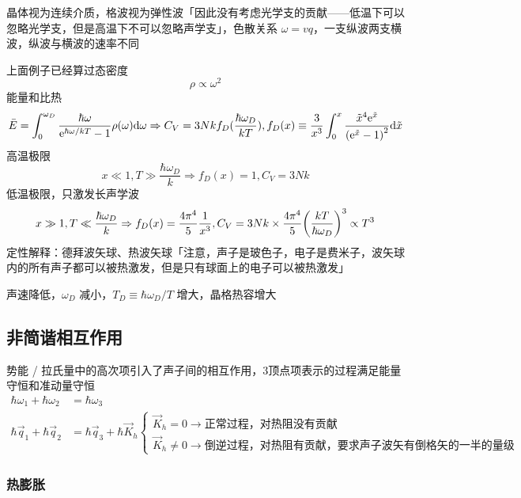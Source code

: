 晶体视为连续介质，格波视为弹性波「因此没有考虑光学支的贡献——低温下可以忽略光学支，但是高温下不可以忽略声学支」，色散关系 $\omega = v q$，一支纵波两支横波，纵波与横波的速率不同

上面例子已经算过态密度
\[ \rho \propto \omega^2 \]
能量和比热
\[ \bar{E} = \int_0^{\omega_D} \frac{\hbar \omega}{\mathrm{e}^{\hbar \omega/k T} - 1} \rho(\omega) \dd \omega \Rightarrow C_V = 3 N k f_D(\frac{\hbar \omega_D}{k T}), f_D(x) \equiv \frac{3}{x^3} \int_0^x \frac{\tilde{x}^4 \mathrm{e}^{\tilde{x}}}{\qty(\mathrm{e}^{\tilde{x}} - 1)^2} \dd \tilde{x} \]
高温极限
\[ x \ll 1, T \gg \frac{\hbar \omega_D}{k} \Rightarrow f_D(x) = 1, C_V = 3 N k \]
低温极限，只激发长声学波
\[ x \gg 1, T \ll \frac{\hbar \omega_D}{k} \Rightarrow f_D(x) = \frac{4 \pi^4}{5} \frac{1}{x^3}, C_V = 3 N k \times \frac{4 \pi^4}{5} \qty(\frac{k T}{\hbar \omega_D})^3 \propto T^3 \]
定性解释：德拜波矢球、热波矢球「注意，声子是玻色子，电子是费米子，波矢球内的所有声子都可以被热激发，但是只有球面上的电子可以被热激发」

{\color{gray}声速降低，$\omega_D$ 减小，$T_D \equiv \hbar \omega_D / T$ 增大，晶格热容增大}

\subsection{非简谐相互作用}

势能 / 拉氏量中的高次项引入了声子间的相互作用，3顶点项表示的过程满足能量守恒和准动量守恒
\begin{align*}
    \hbar \omega_1 + \hbar \omega_2   & = \hbar \omega_3                                                                              \\
    \hbar \vec{q}_1 + \hbar \vec{q}_2 & = \hbar \vec{q}_3 + \hbar \vec{K}_h \begin{cases}
                                                                                \vec{K}_{h} = 0 \to \text{正常过程，对热阻没有贡献} \\
                                                                                \vec{K}_{h} \neq 0 \to \text{倒逆过程，对热阻有贡献，要求声子波矢有倒格矢的一半的量级}
                                                                            \end{cases}
\end{align*}

\subsubsection{热膨胀}

